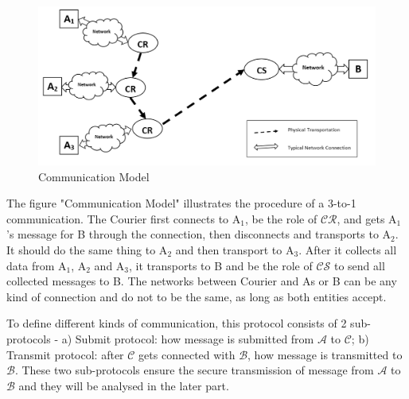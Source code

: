 \begin{figure}[h!]
\includegraphics[width=\textwidth,natwidth=1123,natheight=530]{figures/communicationmodel.png}
\caption{Communication Model}
\end{figure}

The figure "Communication Model" illustrates the procedure of a 3-to-1 communication. The Courier first connects to A$_1$, be the role of $\mathcal{CR}$, and gets A$_1$'s message for B through the connection, then disconnects and transports to A$_2$. It should do the same thing to A$_2$ and then transport to A$_3$. After it collects all data from A$_1$, A$_2$ and A$_3$, it transports to B and be the role of $\mathcal{CS}$ to send all collected messages to B. The networks between Courier and As or B can be any kind of connection and do not to be the same, as long as both entities accept. 

To define different kinds of communication, this protocol consists of 2 sub-protocols - a) Submit protocol: how message is submitted from $\mathcal{A}$ to $\mathcal{C}$; b) Transmit protocol: after $\mathcal{C}$ gets connected with $\mathcal{B}$, how message is transmitted to $\mathcal{B}$. These two sub-protocols ensure the secure transmission of message from $\mathcal{A}$ to $\mathcal{B}$ and they will be analysed in the later part.

